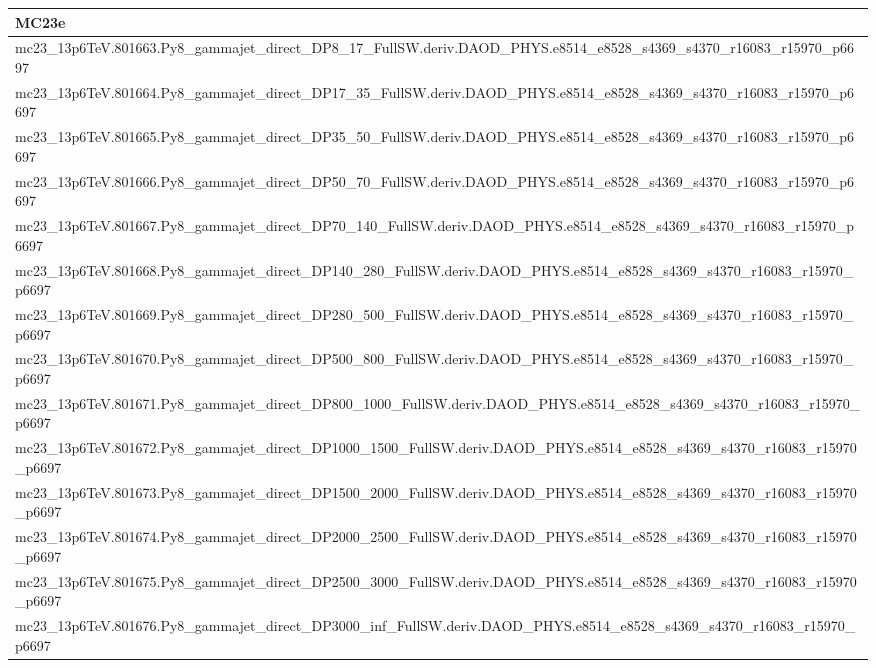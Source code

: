 \begin{table}[ht]
\begin{tabular}{l}
\midrule
MC23e \\
\midrule
mc23\_13p6TeV.801663.Py8\_gammajet\_direct\_DP8\_17\_FullSW.deriv.DAOD\_PHYS.e8514\_e8528\_s4369\_s4370\_r16083\_r15970\_p6697\\
mc23\_13p6TeV.801664.Py8\_gammajet\_direct\_DP17\_35\_FullSW.deriv.DAOD\_PHYS.e8514\_e8528\_s4369\_s4370\_r16083\_r15970\_p6697\\
mc23\_13p6TeV.801665.Py8\_gammajet\_direct\_DP35\_50\_FullSW.deriv.DAOD\_PHYS.e8514\_e8528\_s4369\_s4370\_r16083\_r15970\_p6697\\
mc23\_13p6TeV.801666.Py8\_gammajet\_direct\_DP50\_70\_FullSW.deriv.DAOD\_PHYS.e8514\_e8528\_s4369\_s4370\_r16083\_r15970\_p6697\\
mc23\_13p6TeV.801667.Py8\_gammajet\_direct\_DP70\_140\_FullSW.deriv.DAOD\_PHYS.e8514\_e8528\_s4369\_s4370\_r16083\_r15970\_p6697\\
mc23\_13p6TeV.801668.Py8\_gammajet\_direct\_DP140\_280\_FullSW.deriv.DAOD\_PHYS.e8514\_e8528\_s4369\_s4370\_r16083\_r15970\_p6697\\
mc23\_13p6TeV.801669.Py8\_gammajet\_direct\_DP280\_500\_FullSW.deriv.DAOD\_PHYS.e8514\_e8528\_s4369\_s4370\_r16083\_r15970\_p6697\\
mc23\_13p6TeV.801670.Py8\_gammajet\_direct\_DP500\_800\_FullSW.deriv.DAOD\_PHYS.e8514\_e8528\_s4369\_s4370\_r16083\_r15970\_p6697\\
mc23\_13p6TeV.801671.Py8\_gammajet\_direct\_DP800\_1000\_FullSW.deriv.DAOD\_PHYS.e8514\_e8528\_s4369\_s4370\_r16083\_r15970\_p6697\\
mc23\_13p6TeV.801672.Py8\_gammajet\_direct\_DP1000\_1500\_FullSW.deriv.DAOD\_PHYS.e8514\_e8528\_s4369\_s4370\_r16083\_r15970\_p6697\\
mc23\_13p6TeV.801673.Py8\_gammajet\_direct\_DP1500\_2000\_FullSW.deriv.DAOD\_PHYS.e8514\_e8528\_s4369\_s4370\_r16083\_r15970\_p6697\\
mc23\_13p6TeV.801674.Py8\_gammajet\_direct\_DP2000\_2500\_FullSW.deriv.DAOD\_PHYS.e8514\_e8528\_s4369\_s4370\_r16083\_r15970\_p6697\\
mc23\_13p6TeV.801675.Py8\_gammajet\_direct\_DP2500\_3000\_FullSW.deriv.DAOD\_PHYS.e8514\_e8528\_s4369\_s4370\_r16083\_r15970\_p6697\\
mc23\_13p6TeV.801676.Py8\_gammajet\_direct\_DP3000\_inf\_FullSW.deriv.DAOD\_PHYS.e8514\_e8528\_s4369\_s4370\_r16083\_r15970\_p6697\\ 
\bottomrule
\end{tabular}
\end{table}


